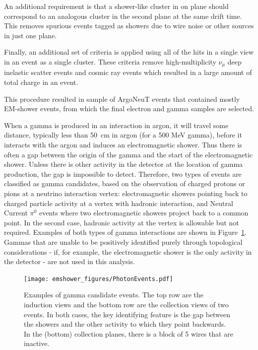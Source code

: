An additional requirement is that a shower-like cluster in on plane should correspond to an analogous cluster in the second plane at the same drift time. This removes spurious events tagged as showers due to wire noise or other sources in just one plane.

Finally, an additional set of criteria is applied using all of the hits in a single view in an event as a single cluster. These criteria remove high-multiplicity $\nu_{\mu}$ deep inelastic scatter events and cosmic ray events which resulted in a large amount of total charge in an event. 

This procedure resulted in sample of ArgoNeuT events that contained mostly EM-shower events, from which the final electron and gamma samples are selected.

When a gamma is produced in an interaction in argon, it will travel some distance, typically less than 50~cm in argon (for a 500 MeV gamma), before it interacts with the argon and induces an electromagnetic shower.  Thus there is often a gap between the origin of the gamma and the start of the electromagnetic shower. Unless there is other activity in the detector at the location of gamma production, the gap is impossible to detect.  Therefore, two types of events are classified as gamma candidates, based on the observation of charged protons or pions at a neutrino interaction vertex: electromagnetic showers pointing back to charged particle activity at a vertex with hadronic interaction, and Neutral Current $\pi^0$ events where two electromagnetic showers project back to a common point.  In the second case, hadronic activity at the vertex is allowable but not required.  Examples of both types of gamma interactions are shown in Figure~\ref{fig:photons}.  Gammas that are unable to be positively identified purely through topological considerations - if, for example, the electromagnetic shower is the only activity in the detector - are not used in this analysis.



\begin{figure}[ht]
\centering
\texttt{[image: emshower\_figures/PhotonEvents.pdf]}
\caption[Photon Events in \argoneut]{\label{fig:photons} Examples of gamma candidate events.  The top row are the induction views and the bottom row are the collection views of two events. In both cases, the key identifying feature is the gap between the showers and the other activity to which they point backwards.  In the (bottom) collection planes, there is a block of 5 wires that are inactive.}
\end{figure}


